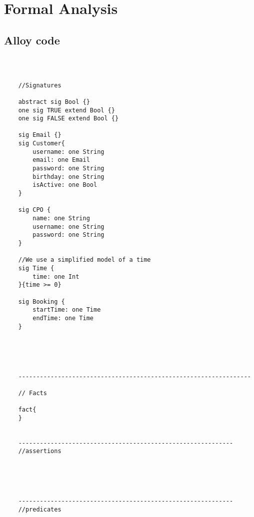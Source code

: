 \section{Formal Analysis}
\subsection{Alloy code}


\begin{lstlisting}[language=alloy]
    
    

    //Signatures

    abstract sig Bool {}
    one sig TRUE extend Bool {}
    one sig FALSE extend Bool {}

    sig Email {}
    sig Customer{
	    username: one String
	    email: one Email
	    password: one String
	    birthday: one String
	    isActive: one Bool
    }

    sig CPO {
	    name: one String
	    username: one String
	    password: one String
    }

    //We use a simplified model of a time
    sig Time {
	    time: one Int
    }{time >= 0}

    sig Booking {
	    startTime: one Time
	    endTime: one Time
    }
    
    
    
   
    
    -----------------------------------------------------------------
    
    // Facts
    
    fact{ 
    }
    
    
    ------------------------------------------------------------
    //assertions
    
    
    
    
    
    ------------------------------------------------------------
    //predicates
    
    
    
   
    
    \end{lstlisting}
